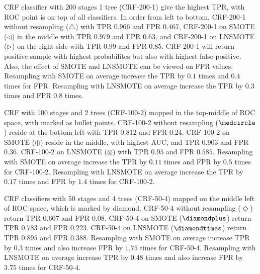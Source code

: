 CRF classifier with 200 stages 1 tree (CRF-200-1) give the highest TPR, with
ROC point is on top of all classifiers.
In order from left to bottom, CRF-200-1 without resampling ($\triangle$) with
TPR $0.966$ and FPR $0.467$, CRF-200-1 on SMOTE ($\triangleleft$) in the middle
with TPR $0.979$ and FPR $0.63$, and CRF-200-1 on LNSMOTE ($\triangleright$) on
the right side with TPR $0.99$ and FPR 0.85.
CRF-200-1 will return positive sample with highest probabilites but also with
highest false-positive.
Also, the effect of SMOTE and LNSMOTE can be viewed on FPR values.
Resampling with SMOTE on average increase the TPR by $0.1$ times and $0.4$
times for FPR.
Resampling with LNSMOTE on average increase the TPR by $0.3$ times and FPR
$0.8$ times.

CRF with 100 stages and 2 trees (CRF-100-2) mapped in the top-middle of ROC
space, with marked as bullet points.
CRF-100-2 without resampling ($\medcircle$) reside at the bottom left with TPR
$0.812$ and FPR $0.24$.
CRF-100-2 on SMOTE ($\oplus$) reside in the middle, with highest AUC, and TPR
$0.903$ and FPR $0.36$.
CRF-100-2 on LNSMOTE ($\otimes$) with TPR $0.95$ and FPR $0.585$.
Resampling with SMOTE on average increase the TPR by $0.11$ times and FPR by
$0.5$ times for CRF-100-2.
Resampling with LNSMOTE on average increase the TPR by $0.17$ times and FPR by
$1.4$ times for CRF-100-2.

CRF classifiers with 50 stages and 4 trees (CRF-50-4) mapped on the middle left
of ROC space, which is marked by diamond.
CRF-50-4 without resampling ($\Diamond$) return TPR $0.607$ and FPR $0.08$.
CRF-50-4 on SMOTE ($\diamondplus$) return TPR $0.783$ and FPR $0.223$.
CRF-50-4 on LNSMOTE ($\diamondtimes$) return TPR $0.895$ and FPR $0.388$.
Resampling with SMOTE on average increase TPR by $0.3$ times and also increase
FPR by $1.75$ times for CRF-50-4.
Resampling with LNSMOTE on average increase TPR by $0.48$ times and also
increase FPR by $3.75$ times for CRF-50-4.
